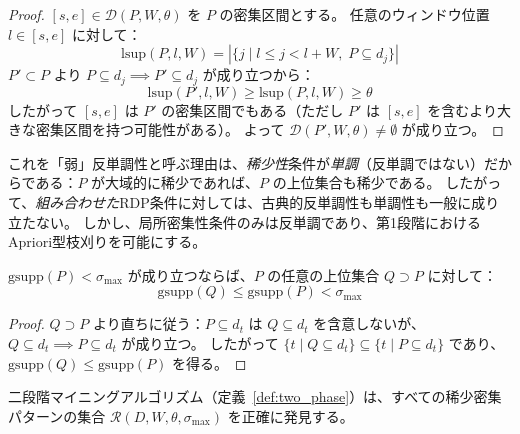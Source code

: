 \begin{proof}
$[s, e] \in \mathcal{D}(P, W, \theta)$ を $P$ の密集区間とする。
任意のウィンドウ位置 $l \in [s, e]$ に対して：
\[
\text{lsup}(P, l, W) = |\{j \mid l \leq j < l+W,\; P \subseteq d_j\}|
\]
$P' \subset P$ より $P \subseteq d_j \implies P' \subseteq d_j$ が成り立つから：
\[
\text{lsup}(P', l, W) \geq \text{lsup}(P, l, W) \geq \theta
\]
したがって $[s, e]$ は $P'$ の密集区間でもある（ただし $P'$ は $[s,e]$ を含むより大きな密集区間を持つ可能性がある）。
よって $\mathcal{D}(P', W, \theta) \neq \emptyset$ が成り立つ。
\end{proof}

\begin{remark}
これを「弱」反単調性と呼ぶ理由は、\emph{稀少性}条件が\emph{単調}（反単調ではない）だからである：$P$ が大域的に稀少であれば、$P$ の上位集合も稀少である。
したがって、\emph{組み合わせた}RDP条件に対しては、古典的反単調性も単調性も一般に成り立たない。
しかし、局所密集性条件のみは反単調であり、第1段階におけるApriori型枝刈りを可能にする。
\end{remark}

\begin{theorem}[大域的稀少性の単調性]\label{thm:rarity_monotone}
$\text{gsupp}(P) < \sigma_{\max}$ が成り立つならば、$P$ の任意の上位集合 $Q \supset P$ に対して：
\begin{equation}
\text{gsupp}(Q) \leq \text{gsupp}(P) < \sigma_{\max}
\end{equation}
\end{theorem}

\begin{proof}
$Q \supset P$ より直ちに従う：$P \subseteq d_t$ は $Q \subseteq d_t$ を含意しないが、
$Q \subseteq d_t \implies P \subseteq d_t$ が成り立つ。
したがって $\{t \mid Q \subseteq d_t\} \subseteq \{t \mid P \subseteq d_t\}$ であり、
$\text{gsupp}(Q) \leq \text{gsupp}(P)$ を得る。
\end{proof}

\begin{theorem}[二段階マイニングの完全性]\label{thm:completeness}
二段階マイニングアルゴリズム（定義~\ref{def:two_phase}）は、すべての稀少密集パターンの集合 $\mathcal{R}(D, W, \theta, \sigma_{\max})$ を正確に発見する。
\end{theorem}

